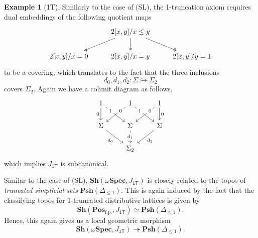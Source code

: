 \documentclass[12pt]{amsart}
\theoremstyle{definition}
\newtheorem{example}[theorem]{Example}
\newcommand{\mb}[1]{\mathbf{#1}}
\newcommand{\mr}[1]{\mathrm{#1}}
\newcommand{\ms}[1]{\mathsf{#1}}
\newcommand{\Pos}{\mb{Pos}}
\newcommand{\sh}{\mb{Sh}}
\newcommand{\psh}{\mb{Psh}}
\newcommand{\surj}{\twoheadrightarrow}
\newcommand{\hook}{\hookrightarrow}
\newcommand{\fp}{_{\mr{f.p.}}}
\newcommand{\cp}{_{\mr{c.p.}}}
\newcommand{\N}{\mb N}
\newcommand{\sFrm}{\sigma\mb{Frm}}
\newcommand{\wSpec}{\omega\mb{Spec}}
\begin{document}
\begin{example}[1T]
  Similarly to the case of (SL), the 1-truncation axiom requires dual embeddings of the following quotient maps
  \[\begin{tikzcd}
    & {2[x,y]/x\le y} \\
    {2[x,y]/x=0} & {2[x,y]/x=y} & {2[x,y]/y=1}
    \arrow[two heads, from=1-2, to=2-1]
    \arrow[two heads, from=1-2, to=2-2]
    \arrow[two heads, from=1-2, to=2-3]
  \end{tikzcd}\]
  to be a covering, which translates to the fact that the three inclusions
  \[ d_0,d_1,d_2 : \Sigma \hook \Sigma_2 \]
  covers $\Sigma_2$. Again we have a colimit diagram as follows, 
  \[\begin{tikzcd}
    1 & 1 & 1 \\
    \Sigma & \Sigma & \Sigma \\
    & {\Sigma_2}
    \arrow["0"', from=1-1, to=2-1]
    \arrow["1"{description, pos=0.25}, from=1-1, to=2-2]
    \arrow["0"{description, pos=0.25}, from=1-2, to=2-1]
    \arrow["1"{description, pos=0.25}, from=1-2, to=2-3]
    \arrow["0"{description, pos=0.25}, from=1-3, to=2-2]
    \arrow["0", from=1-3, to=2-3]
    \arrow["{d_0}"', from=2-1, to=3-2]
    \arrow["{d_1}"{description}, from=2-2, to=3-2]
    \arrow["{d_2}", from=2-3, to=3-2]
  \end{tikzcd}\]
  which implies $J_{\ms{1T}}$ is subcanonical.
  
  Similar to the case of (SL), $\sh(\wSpec,J_{\ms{1T}})$ is closely related to the topos of \emph{truncated simplicial sets} $\psh(\Delta_{\le 1})$. This is again induced by the fact that the classifying topos for 1-truncated distributive lattices is given by 
  \[ \sh(\Pos\fp,J_{\ms{1T}}) \simeq \psh(\Delta_{\le 1}). \]
  Hence, this again gives us a local geometric morphism
  \[ \sh(\wSpec,J_{\ms{1T}}) \surj \psh(\Delta_{\le 1}). \]
\end{example}




\end{document}
